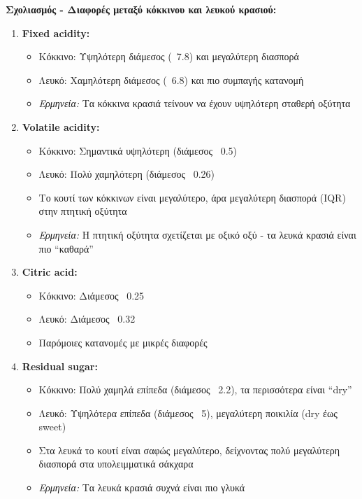 \documentclass[12pt,a4paper]{article}
\begin{document}
\textbf{Σχολιασμός - Διαφορές μεταξύ κόκκινου και λευκού κρασιού:}

\begin{enumerate}
    \item \textbf{Fixed acidity:}
    \begin{itemize}
        \item Κόκκινο: Υψηλότερη διάμεσος (~7.8) και μεγαλύτερη διασπορά
        \item Λευκό: Χαμηλότερη διάμεσος (~6.8) και πιο συμπαγής κατανομή
        \item \textit{Ερμηνεία:} Τα κόκκινα κρασιά τείνουν να έχουν υψηλότερη σταθερή οξύτητα
    \end{itemize}
    
    \item \textbf{Volatile acidity:}
    \begin{itemize}
        \item Κόκκινο: Σημαντικά υψηλότερη (διάμεσος ~0.5)
        \item Λευκό: Πολύ χαμηλότερη (διάμεσος ~0.26)
        \item Το κουτί των κόκκινων είναι μεγαλύτερο, άρα μεγαλύτερη διασπορά (IQR) στην πτητική οξύτητα
        \item \textit{Ερμηνεία:} Η πτητική οξύτητα σχετίζεται με οξικό οξύ - τα λευκά κρασιά είναι πιο ``καθαρά''
    \end{itemize}
    
    \item \textbf{Citric acid:}
    \begin{itemize}
        \item Κόκκινο: Διάμεσος ~0.25
        \item Λευκό: Διάμεσος ~0.32
        \item Παρόμοιες κατανομές με μικρές διαφορές
    \end{itemize}
    
    \item \textbf{Residual sugar:}
    \begin{itemize}
        \item Κόκκινο: Πολύ χαμηλά επίπεδα (διάμεσος ~2.2), τα περισσότερα είναι ``dry''
        \item Λευκό: Υψηλότερα επίπεδα (διάμεσος ~5), μεγαλύτερη ποικιλία (dry έως sweet)
        \item Στα λευκά το κουτί είναι σαφώς μεγαλύτερο, δείχνοντας πολύ μεγαλύτερη διασπορά στα υπολειμματικά σάκχαρα
        \item \textit{Ερμηνεία:} Τα λευκά κρασιά συχνά είναι πιο γλυκά
    \end{itemize}
    

\end{enumerate}
\end{document}

